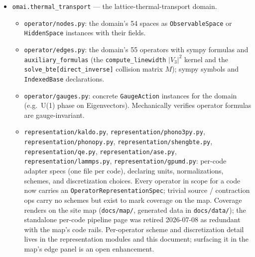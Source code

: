 \documentclass[11pt,a4paper]{article}
\begin{document}
\begin{itemize}[leftmargin=2em, itemsep=0.3em]
\begin{itemize}[leftmargin=1.2em]
            specs describe the same operator?). \texttt{compare\_representations}
            (aliased as \texttt{compare}) returns a
            \texttt{RepresentationComparisonResult} with the five-status
            verdict and residuals.
    \end{itemize}
    Code-agnostic.
  \item \texttt{omai.thermal\_transport} --- the lattice-thermal-transport domain.
    \begin{itemize}[leftmargin=1.2em]
      \item \texttt{operator/nodes.py}: the domain's 54 spaces as \texttt{ObservableSpace} or
            \texttt{HiddenSpace} instances with their fields.
      \item \texttt{operator/edges.py}: the domain's 55 operators with sympy formulas
            and \texttt{auxiliary\_formulas} (the \texttt{compute\_linewidth}
            $|V_3|^2$ kernel and the \texttt{solve\_bte[direct\_inverse]}
            collision matrix $M$); sympy symbols and \texttt{IndexedBase}
            declarations.
      \item \texttt{operator/gauges.py}: concrete \texttt{GaugeAction}
            instances for the domain (e.g.\ U(1) phase on Eigenvectors).
            Mechanically verifies operator formulas are gauge-invariant.
      \item \texttt{representation/kaldo.py},
            \texttt{representation/phono3py.py},
            \texttt{representation/phonopy.py},
            \texttt{representation/shengbte.py},
            \texttt{representation/qe.py},
            \texttt{representation/ase.py},
            \texttt{representation/lammps.py},
            \texttt{representation/gpumd.py}: per-code adapter specs
            (one file per code), declaring units, normalizations, schemes,
            and discretization choices. Every operator in scope for a code
            now carries an \texttt{OperatorRepresentationSpec}; trivial source /
            contraction ops carry no schemes but exist to mark coverage
            on the map. Coverage renders on the site map (\texttt{docs/map/},
            generated data in \texttt{docs/data/}); the standalone per-code
            pipeline page was retired 2026-07-08 as redundant with the map's
            code rails. Per-operator scheme and discretization detail lives in
            the representation modules and this document; surfacing it in the
            map's edge panel is an open enhancement.
    \end{itemize}
\end{itemize}
\end{document}
